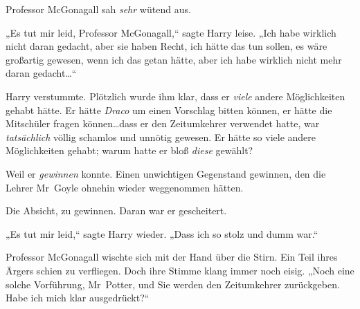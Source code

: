 Professor McGonagall sah \emph{sehr} wütend aus.

„Es tut mir leid, Professor McGonagall,“ sagte Harry leise. „Ich habe wirklich nicht daran gedacht, aber sie haben Recht, ich hätte das tun sollen, es wäre großartig gewesen, wenn ich das getan hätte, aber ich habe wirklich nicht mehr daran gedacht…“

Harry verstummte. Plötzlich wurde ihm klar, dass er \emph{viele} andere Möglichkeiten gehabt hätte. Er hätte \emph{Draco} um einen Vorschlag bitten können, er hätte die Mitschüler fragen können…dass er den Zeitumkehrer verwendet hatte, war \emph{tatsächlich} völlig schamlos und unnötig gewesen. Er hätte so viele andere Möglichkeiten gehabt; warum hatte er bloß \emph{diese} gewählt?

Weil er \emph{gewinnen} konnte. Einen unwichtigen Gegenstand gewinnen, den die Lehrer Mr~Goyle ohnehin wieder weggenommen hätten.

Die Absicht, zu gewinnen. Daran war er gescheitert.

„Es tut mir leid,“ sagte Harry wieder. „Dass ich so stolz und dumm war.“

Professor McGonagall wischte sich mit der Hand über die Stirn. Ein Teil ihres Ärgers schien zu verfliegen. Doch ihre Stimme klang immer noch eisig. „Noch eine solche Vorführung, Mr~Potter, und Sie werden den Zeitumkehrer zurückgeben. Habe ich mich klar ausgedrückt?“

